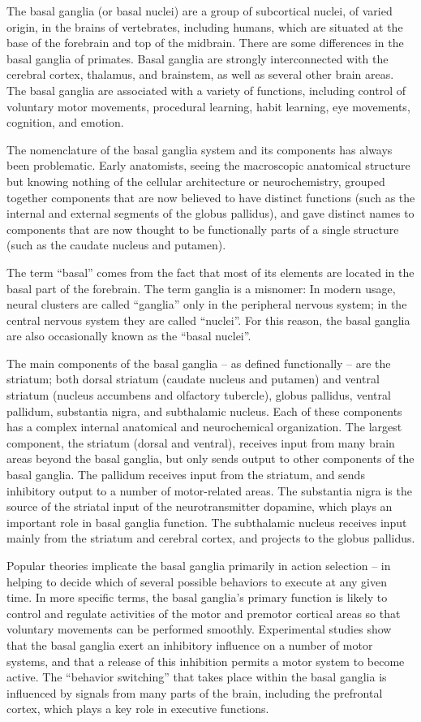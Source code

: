 The basal ganglia (or basal nuclei) are a group of subcortical nuclei,
of varied origin, in the brains of vertebrates, including humans, which
are situated at the base of the forebrain and top of the midbrain. There
are some differences in the basal ganglia of primates. Basal ganglia are
strongly interconnected with the cerebral cortex, thalamus, and
brainstem, as well as several other brain areas. The basal ganglia are
associated with a variety of functions, including control of voluntary
motor movements, procedural learning, habit learning, eye movements,
cognition, and emotion.

The nomenclature of the basal ganglia system and its components has
always been problematic. Early anatomists, seeing the macroscopic
anatomical structure but knowing nothing of the cellular architecture or
neurochemistry, grouped together components that are now believed to
have distinct functions (such as the internal and external segments of
the globus pallidus), and gave distinct names to components that are now
thought to be functionally parts of a single structure (such as the
caudate nucleus and putamen).

The term ``basal'' comes from the fact that most of its elements are
located in the basal part of the forebrain. The term ganglia is a
misnomer: In modern usage, neural clusters are called ``ganglia'' only
in the peripheral nervous system; in the central nervous system they are
called ``nuclei''. For this reason, the basal ganglia are also
occasionally known as the ``basal nuclei''.

The main components of the basal ganglia -- as defined functionally --
are the striatum; both dorsal striatum (caudate nucleus and putamen) and
ventral striatum (nucleus accumbens and olfactory tubercle), globus
pallidus, ventral pallidum, substantia nigra, and subthalamic nucleus.
Each of these components has a complex internal anatomical and
neurochemical organization. The largest component, the striatum (dorsal
and ventral), receives input from many brain areas beyond the basal
ganglia, but only sends output to other components of the basal ganglia.
The pallidum receives input from the striatum, and sends inhibitory
output to a number of motor-related areas. The substantia nigra is the
source of the striatal input of the neurotransmitter dopamine, which
plays an important role in basal ganglia function. The subthalamic
nucleus receives input mainly from the striatum and cerebral cortex, and
projects to the globus pallidus.

Popular theories implicate the basal ganglia primarily in action
selection -- in helping to decide which of several possible behaviors to
execute at any given time. In more specific terms, the basal ganglia's
primary function is likely to control and regulate activities of the
motor and premotor cortical areas so that voluntary movements can be
performed smoothly. Experimental studies show that the basal ganglia
exert an inhibitory influence on a number of motor systems, and that a
release of this inhibition permits a motor system to become active. The
``behavior switching'' that takes place within the basal ganglia is
influenced by signals from many parts of the brain, including the
prefrontal cortex, which plays a key role in executive functions.

